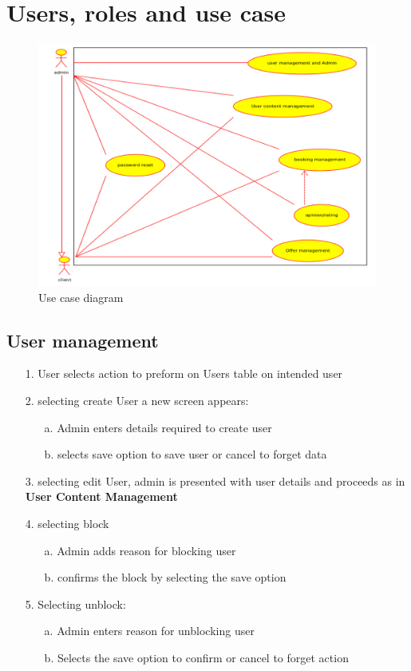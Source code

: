 \section{Users, roles and use case}
\begin{figure}[h!]
\includegraphics[scale=0.25]{img/updated_use_case.jpg}
\caption{Use case diagram}
\end{figure}
\subsection {User management}
\begin{itemize}
\item[1.] User selects action to preform on Users table on intended user
\item[2.] selecting create User a new screen appears:
	\begin{itemize}
		\item[a.] Admin enters details required to create user
		\item[b.] selects save option to save user or cancel to forget data
	\end{itemize}
\item[3.] selecting edit User, admin is presented with user details and proceeds as in \textbf{User Content Management}
\item[4.] selecting block
	\begin{itemize}
	\item[a.] Admin adds reason for blocking user
	\item[b.] confirms the block by selecting the save option
	\end{itemize}
\item[5.] Selecting unblock:
	\begin{itemize}
		\item[a.] Admin enters reason for unblocking user
		\item[b.] Selects the save option to confirm or cancel to forget action	
	\end{itemize}
\end{itemize}
